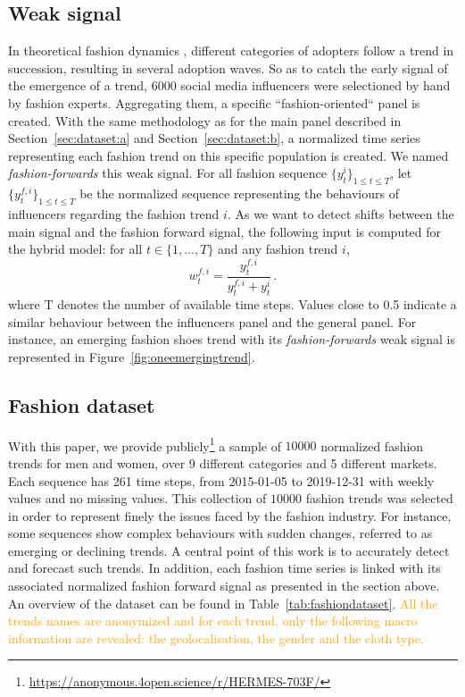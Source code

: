 \documentclass[10pt]{article} %
\newcommand{\ts}{y}
\newcommand{\ws}{w}
\newcommand{\numberts}{10000}
\begin{document}
\subsection{Weak signal}

In theoretical fashion dynamics \citep{rogers1962}, different categories of adopters follow a trend in succession, resulting in several adoption waves.
So as to catch the early signal of the emergence of a trend, 6000 social media influencers were selectioned by hand by fashion experts. Aggregating them, a specific ``fashion-oriented`` panel is created. With the same methodology as for the main panel described in Section~\ref{sec:dataset:a} and Section~\ref{sec:dataset:b}, a normalized time series representing each fashion trend on this specific population is created. We named \textit{fashion-forwards} this weak signal.  For all fashion sequence $\{y^i_t\}_{1 \leq t \leq T}$, let $\{\ts^{f,i}_t\}_{1 \leq t \leq T}$ be the normalized sequence representing the behaviours of influencers regarding the fashion trend $i$. As we want to detect shifts between the main signal and the fashion forward signal, the following input is computed for the hybrid model: for all $t \in \{1,\ldots,T\}$ and any fashion trend $i$,
$$
\ws^{f,i}_{t} = \frac{\ts_t^{f,i}}{\ts_t^{f,i}+\ts_t^{i}}\,.
$$
where T denotes the number of available time steps. Values close to 0.5 indicate a similar behaviour between the influencers panel and the general panel. For instance, an  emerging fashion shoes trend with its \textit{fashion-forwards} weak signal is represented in Figure~\ref{fig:oneemergingtrend}. 

\subsection{Fashion dataset}

With this paper, we provide publicly\footnote[1]{\url{https://anonymous.4open.science/r/HERMES-703F/}} a sample of $\numberts$ normalized fashion trends for men and women, over 9 different categories and 5 different markets. Each sequence has 261 time steps, from 2015-01-05 to 2019-12-31 with weekly values and no missing values. This collection of $\numberts$ fashion trends was selected in order to represent finely the issues faced by the fashion industry. For instance, some sequences show complex behaviours with sudden changes, referred to as emerging or declining trends. A central point of this work is to accurately detect and forecast such trends. In addition, each fashion time series is linked with its associated normalized fashion forward signal as presented in the section above. An overview of the dataset can be found in Table~\ref{tab:fashiondataset}. \textcolor{orange}{All the trends names are anonymized and for each trend, only the following macro information are revealed: the geolocalisation, the gender and the cloth type.}
\end{document}
